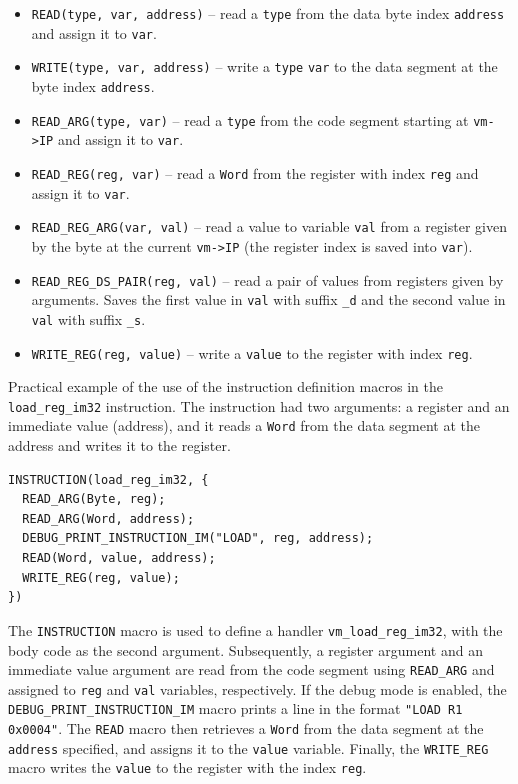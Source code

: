 \documentclass[10pt,a4paper,final]{article}
\newcommand{\code}[1]{\texttt{#1}}
\begin{document}
\begin{itemize}
    \item \code{READ(type, var, address)} -- read a \code{type} from the data
        byte index \code{address} and assign it to \code{var}.
    \item \code{WRITE(type, var, address)} -- write a \code{type} \code{var} to
        the data segment at the byte index \code{address}.
    
    \item \code{READ_ARG(type, var)} -- read a \code{type} from the code segment
        starting at \code{vm->IP} and assign it to \code{var}.
    \item \code{READ_REG(reg, var)} -- read a \code{Word} from the register
        with index \code{reg} and assign it to \code{var}.
    \item \code{READ_REG_ARG(var, val)} -- read a value to variable \code{val} 
        from a register given by the byte at the current \code{vm->IP} (the
        register index is saved into \code{var}).
    \item \code{READ_REG_DS_PAIR(reg, val)} -- read a pair of values from
        registers given by arguments. Saves the first value in \code{val} with
        suffix \code{_d} and the second value in \code{val} with suffix
        \code{_s}. 
    \item \code{WRITE_REG(reg, value)} -- write a \code{value} to the register
        with index \code{reg}.
\end{itemize}

Practical example of the use of the instruction definition macros in the
\code{load_reg_im32} instruction. The instruction had two arguments: a register
and an immediate value (address), and it reads a \code{Word} from the data
segment at the address and writes it to the register.

\begin{verbatim}
INSTRUCTION(load_reg_im32, {
  READ_ARG(Byte, reg);
  READ_ARG(Word, address);
  DEBUG_PRINT_INSTRUCTION_IM("LOAD", reg, address);
  READ(Word, value, address);
  WRITE_REG(reg, value);
})
\end{verbatim}

The \code{INSTRUCTION} macro is used to define a handler
\code{vm_load_reg_im32}, with the body code as the second argument.
Subsequently, a register argument and an immediate value argument are read from
the code segment using \code{READ_ARG} and assigned to \code{reg} and \code{val}
variables, respectively. If the debug mode is enabled, the
\code{DEBUG_PRINT_INSTRUCTION_IM} macro prints a line in the format \code{"LOAD
R1 0x0004"}. The \code{READ} macro then retrieves a \code{Word} from the data
segment at the \code{address} specified, and assigns it to the \code{value}
variable. Finally, the \code{WRITE_REG} macro writes the \code{value} to the
register with the index \code{reg}.
\end{document}
